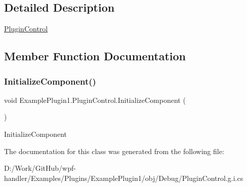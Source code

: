 \subsection{Detailed Description}
\mbox{\hyperlink{class_example_plugin1_1_1_plugin_control}{Plugin\+Control}} 



\subsection{Member Function Documentation}
\mbox{\label{class_example_plugin1_1_1_plugin_control_a8bbee8bd8cafb6b0106fa9de76811725}} 
\subsubsection{\texorpdfstring{Initialize\+Component()}{InitializeComponent()}}
{\footnotesize\ttfamily void Example\+Plugin1.\+Plugin\+Control.\+Initialize\+Component (\begin{DoxyParamCaption}{ }\end{DoxyParamCaption})}



Initialize\+Component 



The documentation for this class was generated from the following file\+:\begin{DoxyCompactItemize}
\item 
D\+:/\+Work/\+Git\+Hub/wpf-\/handler/\+Examples/\+Plugins/\+Example\+Plugin1/obj/\+Debug/Plugin\+Control.\+g.\+i.\+cs\end{DoxyCompactItemize}
